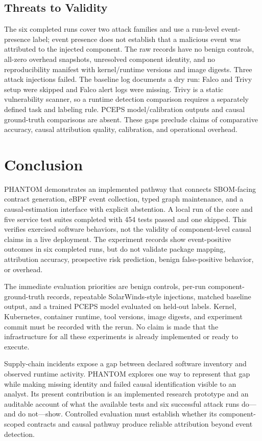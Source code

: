 \documentclass[conference]{IEEEtran}
\begin{document}
\subsection{Threats to Validity}
The six completed runs cover two attack families and use a run-level event-presence label; event presence does not establish that a malicious event was attributed to the injected component. The raw records have no benign controls, all-zero overhead snapshots, unresolved component identity, and no reproducibility manifest with kernel/runtime versions and image digests. Three attack injections failed. The baseline log documents a dry run: Falco and Trivy setup were skipped and Falco alert logs were missing. Trivy is a static vulnerability scanner, so a runtime detection comparison requires a separately defined task and labeling rule. PCEPS model/calibration outputs and causal ground-truth comparisons are absent. These gaps preclude claims of comparative accuracy, causal attribution quality, calibration, and operational overhead.

\FloatBarrier
\section{Conclusion}
PHANTOM demonstrates an implemented pathway that connects SBOM-facing contract generation, eBPF event collection, typed graph maintenance, and a causal-estimation interface with explicit abstention. A local run of the core and five service test suites completed with 454 tests passed and one skipped. This verifies exercised software behaviors, not the validity of component-level causal claims in a live deployment. The experiment records show event-positive outcomes in six completed runs, but do not validate package mapping, attribution accuracy, prospective risk prediction, benign false-positive behavior, or overhead.

The immediate evaluation priorities are benign controls, per-run component-ground-truth records, repeatable SolarWinds-style injections, matched baseline output, and a trained PCEPS model evaluated on held-out labels. Kernel, Kubernetes, container runtime, tool versions, image digests, and experiment commit must be recorded with the rerun. No claim is made that the infrastructure for all these experiments is already implemented or ready to execute.

Supply-chain incidents expose a gap between declared software inventory and observed runtime activity. PHANTOM explores one way to represent that gap while making missing identity and failed causal identification visible to an analyst. Its present contribution is an implemented research prototype and an auditable account of what the available tests and six successful attack runs do—and do not—show. Controlled evaluation must establish whether its component-scoped contracts and causal pathway produce reliable attribution beyond event detection.
\end{document}
